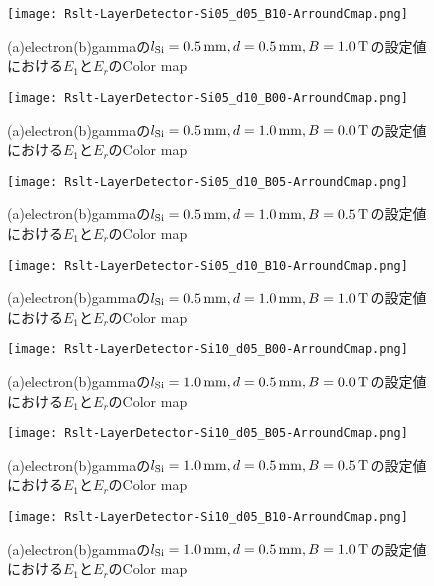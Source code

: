 \documentclass[a4paper,10pt]{jreport}
\begin{document}
\begin{figure}[H]
	\center
	\texttt{[image: Rslt-LayerDetector-Si05\_d05\_B10-ArroundCmap.png]}
	\caption{(a)electron(b)gammaの$l_{\rm{Si}}=\SI{0.5}{mm}, d=\SI{0.5}{mm}, B=\SI{1.0}{T}$の設定値における$E_1$と$E_r$のColor map}
	\label{Rslt-LayerDetector-Si05_d05_B10-ArroundCmap}
\end{figure}

\begin{figure}[H]
	\center
	\texttt{[image: Rslt-LayerDetector-Si05\_d10\_B00-ArroundCmap.png]}
	\caption{(a)electron(b)gammaの$l_{\rm{Si}}=\SI{0.5}{mm}, d=\SI{1.0}{mm}, B=\SI{0.0}{T}$の設定値における$E_1$と$E_r$のColor map}
	\label{Rslt-LayerDetector-Si05_d10_B00-ArroundCmap}
\end{figure}

\begin{figure}[H]
	\center
	\texttt{[image: Rslt-LayerDetector-Si05\_d10\_B05-ArroundCmap.png]}
	\caption{(a)electron(b)gammaの$l_{\rm{Si}}=\SI{0.5}{mm}, d=\SI{1.0}{mm}, B=\SI{0.5}{T}$の設定値における$E_1$と$E_r$のColor map}
	\label{Rslt-LayerDetector-Si05_d10_B05-ArroundCmap}
\end{figure}

\begin{figure}[H]
	\center
	\texttt{[image: Rslt-LayerDetector-Si05\_d10\_B10-ArroundCmap.png]}
	\caption{(a)electron(b)gammaの$l_{\rm{Si}}=\SI{0.5}{mm}, d=\SI{1.0}{mm}, B=\SI{1.0}{T}$の設定値における$E_1$と$E_r$のColor map}
	\label{Rslt-LayerDetector-Si05_d10_B10-ArroundCmap}
\end{figure}

\begin{figure}[H]
	\center
	\texttt{[image: Rslt-LayerDetector-Si10\_d05\_B00-ArroundCmap.png]}
	\caption{(a)electron(b)gammaの$l_{\rm{Si}}=\SI{1.0}{mm}, d=\SI{0.5}{mm}, B=\SI{0.0}{T}$の設定値における$E_1$と$E_r$のColor map}
	\label{Rslt-LayerDetector-Si10_d05_B00-ArroundCmap}
\end{figure}

\begin{figure}[H]
	\center
	\texttt{[image: Rslt-LayerDetector-Si10\_d05\_B05-ArroundCmap.png]}
	\caption{(a)electron(b)gammaの$l_{\rm{Si}}=\SI{1.0}{mm}, d=\SI{0.5}{mm}, B=\SI{0.5}{T}$の設定値における$E_1$と$E_r$のColor map}
	\label{Rslt-LayerDetector-Si10_d05_B05-ArroundCmap}
\end{figure}

\begin{figure}[H]
	\center
	\texttt{[image: Rslt-LayerDetector-Si10\_d05\_B10-ArroundCmap.png]}
	\caption{(a)electron(b)gammaの$l_{\rm{Si}}=\SI{1.0}{mm}, d=\SI{0.5}{mm}, B=\SI{1.0}{T}$の設定値における$E_1$と$E_r$のColor map}
	\label{Rslt-LayerDetector-Si10_d05_B10-ArroundCmap}
\end{figure}
\end{document}
